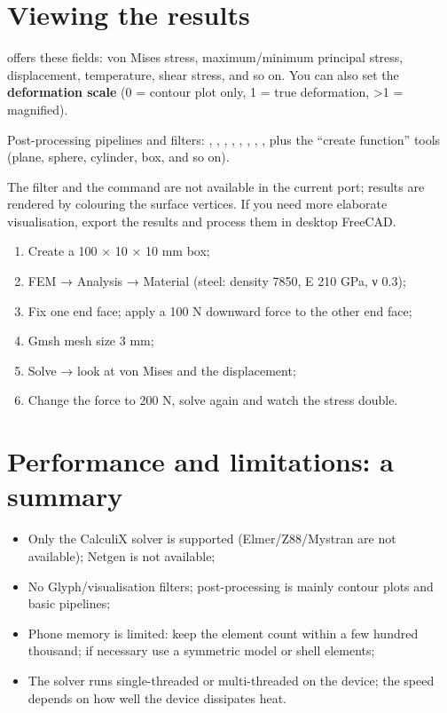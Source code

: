 \section{Viewing the results}

 offers these fields: von Mises stress, maximum/minimum principal stress, displacement,
temperature, shear stress, and so on. You can also set the \textbf{deformation scale} (0 = contour plot
only, 1 = true deformation, >1 = magnified).

Post-processing pipelines and filters: , , , ,
, , , , plus the ``create function''
tools (plane, sphere, cylinder, box, and so on).


\begin{warn}
The  filter and the  command are not available in the current port; results are
rendered by colouring the surface vertices. If you need more elaborate visualisation, export the results
and process them in desktop FreeCAD.
\end{warn}

\begin{practice}
\begin{enumerate}
  \item Create a 100 × 10 × 10 mm box;
  \item FEM → Analysis → Material (steel: density 7850, E 210 GPa, ν 0.3);
  \item Fix one end face; apply a 100 N downward force to the other end face;
  \item Gmsh mesh size 3 mm;
  \item Solve → look at von Mises and the displacement;
  \item Change the force to 200 N, solve again and watch the stress double.
\end{enumerate}
\end{practice}

\section{Performance and limitations: a summary}

\begin{itemize}
  \item Only the CalculiX solver is supported (Elmer/Z88/Mystran are not available); Netgen is not
        available;
  \item No Glyph/visualisation filters; post-processing is mainly contour plots and basic pipelines;
  \item Phone memory is limited: keep the element count within a few hundred thousand; if necessary use a
        symmetric model or shell elements;
  \item The solver runs single-threaded or multi-threaded on the device; the speed depends on how well the
        device dissipates heat.
\end{itemize}
